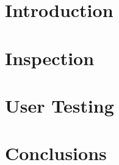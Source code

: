 \documentclass[10pt]{article}
\begin{document}

\restoregeometry

\setcounter{tocdepth}{5}
\tableofcontents
\listoffigures
\listoftables
\pagebreak

\justify

\section{Introduction}

\pagebreak

\section{Inspection}

\pagebreak

\section{User Testing}

\pagebreak

\section{Conclusions}

\pagebreak

\printbibliography
\end{document}
